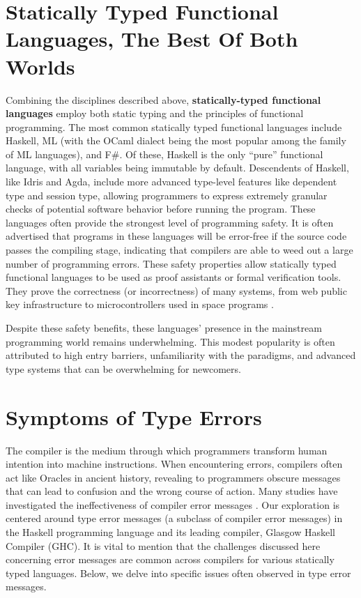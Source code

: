 \section{Statically Typed Functional Languages, The Best Of Both Worlds}
Combining the disciplines described above, \textbf{statically-typed functional languages} employ both static typing and the principles of functional programming. The most common statically typed functional languages include Haskell,  ML (with the OCaml dialect being the most popular among the family of ML languages), and F\#. 
Of these, Haskell is the only ``pure'' functional language, with all variables being immutable by default.
Descendents of Haskell, like Idris and Agda, include more advanced type-level features like dependent type and session type, allowing programmers to express extremely granular checks of potential software behavior before running the program. These languages often provide the strongest level of programming safety. It is often advertised that programs in these languages will be error-free if the source code passes the compiling stage, indicating that compilers are able to weed out a large number of programming errors. These safety properties allow statically typed functional languages to be used as proof assistants or formal verification tools. They prove the correctness (or incorrectness) of many systems, from web public key infrastructure \cite{Bhargavan2021-no} to microcontrollers used in space programs \cite{Mokhov2019-zj}. 

Despite these safety benefits, these languages' presence in the mainstream programming world remains underwhelming. This modest popularity is often attributed to high entry barriers, unfamiliarity with the paradigms, and advanced type systems that can be overwhelming for newcomers.

\section{Symptoms of Type Errors}
\label{sec:symptoms}
 The compiler is the medium through which programmers transform human intention into machine instructions. When encountering errors, compilers often act like Oracles in ancient history, revealing to programmers obscure messages that can lead to confusion and the wrong course of action. Many studies have investigated the ineffectiveness of compiler error messages \cite{Barik2017-gy, Becker2019-cs, Becker2016-kc}.  Our exploration is centered around type error messages (a subclass of compiler error messages) in the Haskell programming language and its leading compiler, Glasgow Haskell Compiler (GHC). It is vital to mention that the challenges discussed here concerning error messages are common across compilers for various statically typed languages. Below, we delve into specific issues often observed in type error messages.


